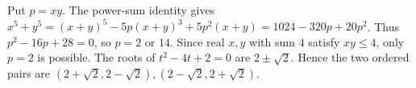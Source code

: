 Put $p=xy$. The power-sum identity gives $x^5+y^5=(x+y)^5-5p(x+y)^3+5p^2(x+y)=1024-320p+20p^2$. Thus $p^2-16p+28=0$, so $p=2$ or $14$. Since real $x,y$ with sum $4$ satisfy $xy\le4$, only $p=2$ is possible. The roots of $t^2-4t+2=0$ are $2\pm\sqrt2$. Hence the two ordered pairs are $\boxed{(2+\sqrt2,2-\sqrt2),(2-\sqrt2,2+\sqrt2)}$.
